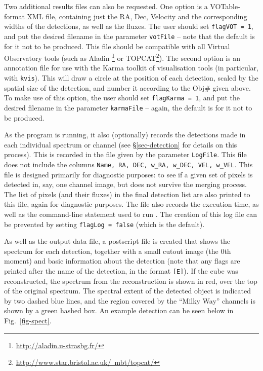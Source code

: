 Two additional results files can also be requested. One option is a
VOTable-format XML file, containing just the RA, Dec, Velocity and the
corresponding widths of the detections, as well as the fluxes. The
user should set \texttt{flagVOT = 1}, and put the desired filename in
the parameter \texttt{votFile} -- note that the default is for it not
to be produced. This file should be compatible with all Virtual
Observatory tools (such as Aladin%
\footnote{%
\href{http://aladin.u-strasbg.fr/}{http://aladin.u-strasbg.fr/}}
or TOPCAT\footnote{%
\href{http://www.star.bristol.ac.uk/~mbt/topcat/}%
{http://www.star.bristol.ac.uk/~mbt/topcat/}}). The second option is
an annotation file for use with the Karma toolkit of visualisation
tools (in particular, with \texttt{kvis}). This will draw a circle at
the position of each detection, scaled by the spatial size of the
detection, and number it according to the Obj\# given above. To make
use of this option, the user should set
\texttt{flagKarma = 1}, and put the desired filename in the parameter
\texttt{karmaFile} -- again, the default is for it not to be produced.

As the program is running, it also (optionally) records the detections
made in each individual spectrum or channel (see \S\ref{sec-detection}
for details on this process). This is recorded in the file given by
the parameter \texttt{LogFile}. This file does not include the columns
\texttt{Name, RA, DEC, w\_RA, w\_DEC, VEL, w\_VEL}. This file is
designed primarily for diagnostic purposes: \eg to see if a given set
of pixels is detected in, say, one channel image, but does not survive
the merging process. The list of pixels (and their fluxes) in the
final detection list are also printed to this file, again for
diagnostic purposes. The file also records the execution time, as well
as the command-line statement used to run \duchamp. The creation of
this log file can be prevented by setting \texttt{flagLog = false}
(which is the default).


As well as the output data file, a postscript file is created that
shows the spectrum for each detection, together with a small cutout
image (the 0th moment) and basic information about the detection (note
that any flags are printed after the name of the detection, in the
format \texttt{[E]}). If the cube was reconstructed, the spectrum from
the reconstruction is shown in red, over the top of the original
spectrum. The spectral extent of the detected object is indicated by
two dashed blue lines, and the region covered by the ``Milky Way''
channels is shown by a green hashed box. An example detection can be
seen below in Fig.~\ref{fig-spect}.

